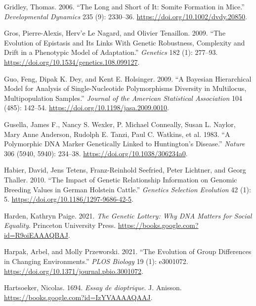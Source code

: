 \documentclass[
]{book}
\newlength{\cslhangindent}
\newlength{\cslentryspacingunit} %
\newenvironment{CSLReferences}[2] %
 {%
  \setlength{\parindent}{0pt}
  \ifodd #1
  \let\oldpar\par
  \def\par{\hangindent=\cslhangindent\oldpar}
  \fi
  \setlength{\parskip}{#2\cslentryspacingunit}
 }%
 {}
\begin{document}
\begin{CSLReferences}{1}{0}
\leavevmode{}%
Gridley, Thomas. 2006. {``The Long and Short of It: {Somite} Formation in Mice.''} \emph{Developmental Dynamics} 235 (9): 2330--36. \url{https://doi.org/10.1002/dvdy.20850}.

\leavevmode{}%
Gros, Pierre-Alexis, Herv'e Le Nagard, and Olivier Tenaillon. 2009. {``The {Evolution} of {Epistasis} and {Its Links With Genetic Robustness}, {Complexity} and {Drift} in a {Phenotypic Model} of {Adaptation}.''} \emph{Genetics} 182 (1): 277--93. \url{https://doi.org/10.1534/genetics.108.099127}.

\leavevmode{}%
Guo, Feng, Dipak K. Dey, and Kent E. Holsinger. 2009. {``A {Bayesian Hierarchical Model} for {Analysis} of {Single-Nucleotide Polymorphisms Diversity} in {Multilocus}, {Multipopulation Samples}.''} \emph{Journal of the American Statistical Association} 104 (485): 142--54. \url{https://doi.org/10.1198/jasa.2009.0010}.

\leavevmode{}%
Gusella, James F., Nancy S. Wexler, P. Michael Conneally, Susan L. Naylor, Mary Anne Anderson, Rudolph E. Tanzi, Paul C. Watkins, et al. 1983. {``A Polymorphic {DNA} Marker Genetically Linked to {Huntington}'s Disease.''} \emph{Nature} 306 (5940, 5940): 234--38. \url{https://doi.org/10.1038/306234a0}.

\leavevmode{}%
Habier, David, Jens Tetens, Franz-Reinhold Seefried, Peter Lichtner, and Georg Thaller. 2010. {``The Impact of Genetic Relationship Information on Genomic Breeding Values in {German Holstein} Cattle.''} \emph{Genetics Selection Evolution} 42 (1): 5. \url{https://doi.org/10.1186/1297-9686-42-5}.

\leavevmode{}%
Harden, Kathryn Paige. 2021. \emph{The {Genetic Lottery}: {Why DNA Matters} for {Social Equality}}. {Princeton University Press}. \url{https://books.google.com?id=R9oiEAAAQBAJ}.

\leavevmode{}%
Harpak, Arbel, and Molly Przeworski. 2021. {``The Evolution of Group Differences in Changing Environments.''} \emph{PLOS Biology} 19 (1): e3001072. \url{https://doi.org/10.1371/journal.pbio.3001072}.

\leavevmode{}%
Hartsoeker, Nicolas. 1694. \emph{Essay de dioptrique}. {J. Anisson}. \url{https://books.google.com?id=IzYVAAAAQAAJ}.


\end{CSLReferences}
\end{document}
